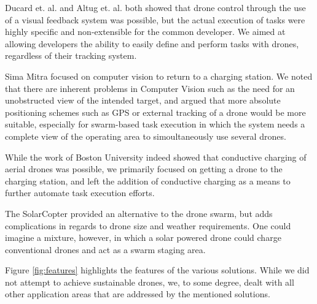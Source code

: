 Ducard et. al. and Altug et. al. both showed that drone control through the use of a visual feedback system was possible, but the actual execution of tasks were highly specific and non-extensible for the common developer. We aimed at allowing developers the ability to easily define and perform tasks with drones, regardless of their tracking system.

Sima Mitra focused on computer vision to return to a charging station. We noted that there are inherent problems in Computer Vision such as the need for an unobstructed view of the intended target, and argued that more absolute positioning schemes such as GPS or external tracking of a drone would be more suitable, especially for swarm-based task execution in which the system needs a complete view of the operating area to simoultaneously use several drones.

While the work of Boston University indeed showed that conductive charging of aerial drones was possible, we primarily focused on getting a drone to the charging station, and left the addition of conductive charging as a means to further automate task execution efforts.

The SolarCopter provided an alternative to the drone swarm, but adds complications in regards to drone size and weather requirements. One could imagine a mixture, however, in which a solar powered drone could charge conventional drones and act as a swarm staging area.

Figure \ref{fig:features} highlights the features of the various solutions. While we did not attempt to achieve sustainable drones, we, to some degree, dealt with all other application areas that are addressed by the mentioned solutions.


